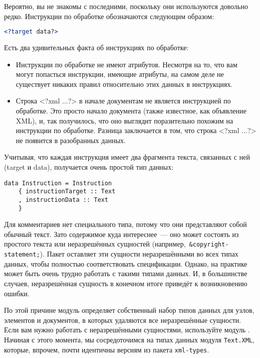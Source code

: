 \begin{remark}
    Вероятно, вы не знакомы с последними, поскольку они используются довольно
    редко. Инструкции по обработке обозначаются следующим образом:
    \begin{lstlisting}[language=XML]
    <?target data?>
    \end{lstlisting}

    Есть два удивительных факта об инструкциях по обработке:
    \begin{itemize}
    \item Инструкции по обработке не имеют атрибутов. Несмотря на то, что вам
        могут попасться инструкции, имеющие атрибуты, на самом деле не
        существует никаких правил относительно этих данных в инструкциях.

    \item Строка <?xml ...?> в начале документам не является инструкцией по
        обработке. Это просто начало документа (также известное, как объявление
        XML), и, так получилось, что оно выглядит поразительно похожим на
        инструкции по обработке. Разница заключается в том, что строка <?xml
        ...?> не появится в разобранных данных.
    \end{itemize}

\end{remark}

Учитывая, что каждая инструкция имеет два фрагмента текста, связанных с ней
(target и data), получается очень простой тип данных:
\begin{lstlisting}
data Instruction = Instruction
    { instructionTarget :: Text
    , instructionData :: Text
    }
\end{lstlisting}

Для комментариев нет специального типа, потому что они представляют собой
обычный текст. Зато содержимое куда интереснее~--- оно может состоять из
простого текста или неразрешённых сущностей
(например,~\lstinline!&copyright-statement;!). Пакет
оставляет эти сущности неразрешёнными во всех типах данных, чтобы полностью
соответствовать спецификации. Однако, на практике может быть очень трудно
работать с такими типами данных. И, в большинстве случаев, неразрешённая
сущность в конечном итоге приведёт к возникновению ошибки.

По этой причине модуль
определяет собственный набор типов данных для узлов, элементов и документов, в
которых удаляются все неразрешённые сущности. Если вам нужно работать с
неразрешёнными сущностями, используйте модуль
.
Начиная с этого момента, мы сосредоточимся на типах данных модуля
\lstinline!Text.XML!, которые, впрочем, почти идентичны версиям из пакета
\lstinline!xml-types!.

